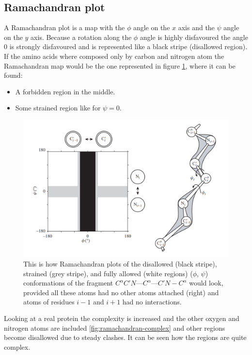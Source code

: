 	\subsection{Ramachandran plot}
	A Ramachandran plot is a map with the $\phi$ angle on the $x$ axis and the $\psi$ angle on the $y$ axis.
	Because a rotation along the $\phi$ angle is highly disfavoured the angle $0$ is strongly disfavoured and is represented like a black stripe (disallowed region).
	If the amino acids where composed only by carbon and nitrogen atom the Ramachandran map would be the one represented in figure \ref{fig:rama}, where it can be found:

	\begin{multicols}{2}
		\begin{itemize}
			\item A forbidden region in the middle.
			\item Some strained region like for $\psi=0$.
		\end{itemize}
	\end{multicols}

	\begin{figure}[H]
		\centering
		\includegraphics[width=\textwidth]{rama_map.png}
		\caption{This is how Ramachandran plots of the disallowed (black stripe), strained (grey stripe), and fully allowed (white regions) ($\phi$, $\psi$) conformations of the fragment $C^{\alpha}C'N$---$C^{\alpha}$---$C'N-C^{\alpha}$ would look, provided all these atoms had no other atoms attached (right) and atoms of residues $i-1$ and $i+1$ had no interactions.}
		\label{fig:rama}
	\end{figure}

	Looking at a real protein the complexity is increased and the other oxygen and nitrogen atoms are included \ref{fig:ramachandran-complex} and other regions become disallowed due to steady clashes.
	It can be seen how the regions are quite complex.

